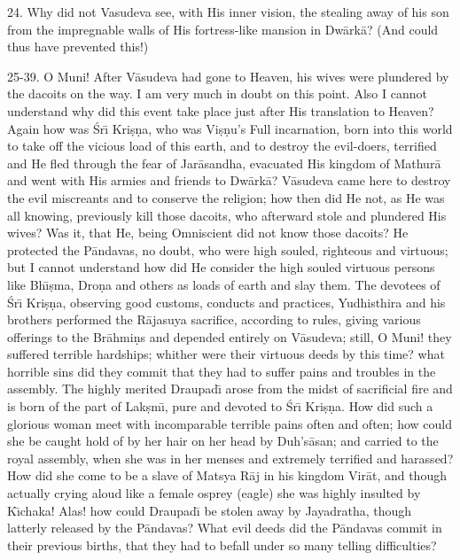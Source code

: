 24. Why did not Vasudeva see, with His inner vision, the stealing away of his son from the impregnable walls of His fortress-like mansion in Dw\=ark\=a? (And could thus have prevented this!)

25-39. O Muni! After V\=asudeva had gone to Heaven, his wives were plundered by the dacoits on the way. I am very much in doubt on this point. Also I cannot understand why did this event take place just after His translation to Heaven? Again how was \'Sr\={\i} Kri\d{s}\d{n}a, who was Vi\d{s}\d{n}u's Full incarnation, born into this world to take off the vicious load of this earth, and to destroy the evil-doers, terrified and He fled through the fear of Jar\=asandha, evacuated His kingdom of Mathur\=a and went with His armies and friends to Dw\=ark\=a? V\=asudeva came here to destroy the evil miscreants and to conserve the religion; how then did He not, as He was all knowing, previously kill those dacoits, who afterward stole and plundered His wives? Was it, that He, being Omniscient did not know those dacoits? He protected the P\=andavas, no doubt, who were high souled, righteous and virtuous; but I cannot understand how did He consider the high souled virtuous persons like Bh\={\i}\d{s}ma, Dro\d{n}a and others as loads of earth and slay them. The devotees of \'Sr\={\i} Kri\d{s}\d{n}a, observing good customs, conducts and practices, Yudhisthira and his brothers performed the R\=ajasuya sacrifice, according to rules, giving various offerings to the Br\=ahmi\d{n}s and depended entirely on V\=asudeva; still, O Muni! they suffered terrible hardships; whither were their virtuous deeds by this time? what horrible sins did they commit that they had to suffer pains and troubles in the assembly. The highly merited Draupad\={\i} arose from the midst of sacrificial fire and is born of the part of Lak\d{s}m\={\i}, pure and devoted to \'Sr\={\i} Kri\d{s}\d{n}a. How did such a glorious woman meet with incomparable terrible pains often and often; how could she be caught hold of by her hair on her head by Duh's\=asan; and carried to the royal assembly, when she was in her menses and extremely terrified and harassed? How did she come to be a slave of Matsya R\=aj in his kingdom Vir\=at, and though actually crying aloud like a female osprey (eagle) she was highly insulted by K\={\i}chaka! Alas! how could Draupad\={\i} be stolen away by Jayadratha, though latterly released by the P\=andavas? What evil deeds did the P\=andavas commit in their previous births, that they had to befall under so many telling difficulties?


